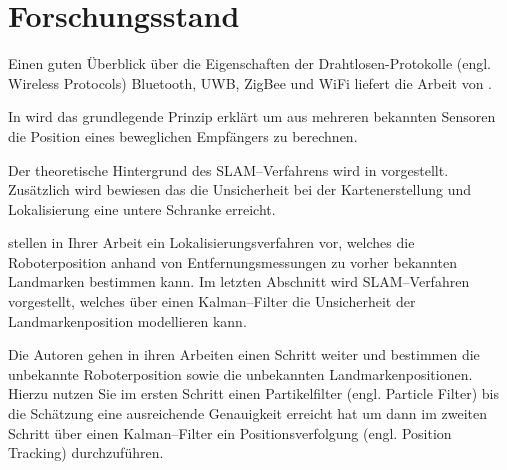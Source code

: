 \documentclass[12pt]{article}
\begin{document}
%
%
%
%
\section{Forschungsstand}

Einen guten Überblick über die Eigenschaften der Drahtlosen-Protokolle (engl. Wireless Protocols) Bluetooth, UWB, ZigBee und WiFi liefert die Arbeit \cite{lee2007comparative} von \citeauthor{lee2007comparative}.

In \cite{smith1987closed} wird das grundlegende Prinzip erklärt um aus mehreren bekannten Sensoren die Position eines beweglichen Empfängers zu berechnen.

Der theoretische Hintergrund des SLAM--Verfahrens wird in \cite{dissanayake2001solution} vorgestellt. Zusätzlich wird bewiesen das die Unsicherheit bei der Kartenerstellung und Lokalisierung eine untere Schranke erreicht.

\citeauthor{kantor2002preliminary} stellen in Ihrer Arbeit \cite{kantor2002preliminary} ein Lokalisierungsverfahren vor, welches die Roboterposition anhand von Entfernungsmessungen zu vorher bekannten Landmarken bestimmen kann. Im letzten Abschnitt wird SLAM--Verfahren vorgestellt, welches über einen Kalman--Filter die Unsicherheit der Landmarkenposition modellieren kann.

Die Autoren \citeauthor{blanco2008pure} gehen in ihren Arbeiten \cite{blanco2008pure, blanco2008efficient} einen Schritt weiter und bestimmen die unbekannte Roboterposition sowie die unbekannten Landmarkenpositionen. Hierzu nutzen Sie im ersten Schritt einen Partikelfilter (engl. Particle Filter) bis die Schätzung eine ausreichende Genauigkeit erreicht hat um dann im zweiten Schritt über einen Kalman--Filter ein Positionsverfolgung (engl. Position Tracking) durchzuführen.
\end{document}
